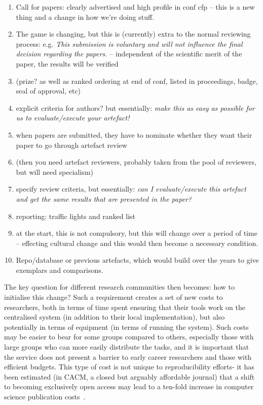 \documentclass{llncs}
\begin{document}
\begin{enumerate}
\item Call for papers: clearly advertised and high profile in conf cfp
  -- this is a new thing and a change in how we're doing stuff.
\item The game is changing, but this is (currently) extra to the
  normal reviewing process: 
e.g. {\emph{This submission is voluntary and will not influence the final decision
regarding the papers.}} -- independent of the scientific merit of the
paper, the results will be verified 
\item (prize? as well as ranked ordering at end of conf, listed in
  proceedings, badge, seal of approval, etc)
\item explicit criteria for authors? but essentially: {\emph{make this
      as easy as possible for us to evaluate/execute your artefact!}}
\item when papers are submitted, they have to nominate whether they
  want their paper to go through artefact review
\item (then you need artefact reviewers, probably taken from the pool of
  reviewers, but will need specialism)
\item specify review criteria, but essentially: {\emph{can I evaluate/execute this
  artefact and get the same results that are presented in the paper?}}
\item reporting: traffic lights and ranked list
\item at the start, this is not compulsory, but this will change over a period of
time -- effecting cultural change and this would then become a
necessary condition.
\item Repo/database or previous artefacts, which would build over the
  years to give exemplars and comparisons.
\end{enumerate}

The key question for different research communities then becomes: how
to initialise this change? Such a requirement creates a set of new
costs to researchers, both in terms of time spent ensuring that their
tools work on the centralised system (in addition to their local
implementation), but also potentially in terms of equipment (in terms
of running the system). Such costs may be easier to bear for some
groups compared to others, especially those with large groups who can
more easily distribute the tasks, and it is important that the service
does not present a barrier to early career researchers and those with
efficient budgets. This type of cost is not unique to reproducibility
efforts- it has been estimated (in CACM, a closed but arguably
affordable journal) that a shift to becoming exclusively open access
may lead to a ten-fold increase in computer science publication
costs~\cite{vardi-cacm-2014}. 
\end{document}
